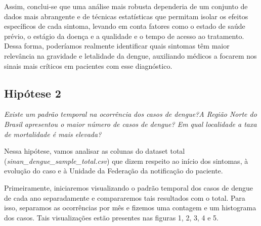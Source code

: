 \documentclass[a4paper, 12pt, twoside]{article}
\begin{document}
Assim, conclui-se que uma análise mais robusta dependeria de um conjunto de dados mais abrangente e de técnicas estatísticas que permitam isolar os efeitos específicos de cada sintoma, levando em conta fatores como o estado de saúde prévio, o estágio da doença e a qualidade e o tempo de acesso ao tratamento. Dessa forma, poderíamos realmente identificar quais sintomas têm maior relevância na gravidade e letalidade da dengue, auxiliando médicos a focarem nos sinais mais críticos em pacientes com esse diagnóstico.


\subsection{Hipótese 2} 

\emph{Existe um padrão temporal na ocorrência dos casos de dengue?A Região Norte do Brasil apresentou o maior número de casos de dengue? Em qual localidade a taxa de mortalidade é mais elevada?}

Nessa hipótese, vamos analisar as colunas do dataset total (\textit{sinan\_dengue\_sample\_total.csv}) que dizem respeito ao início dos sintomas, à evolução do caso e à Unidade da Federação da notificação do paciente.

Primeiramente, iniciaremos visualizando o padrão temporal dos casos de dengue de cada ano separadamente e compararemos tais resultados com o total. Para isso, separamos as ocorrências por mês e fizemos uma contagem e um histograma dos casos. Tais visualizações estão presentes nas figuras 1, 2, 3, 4 e 5. 
\end{document}
